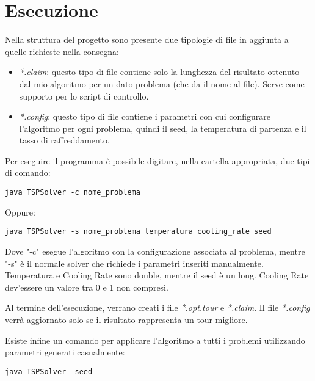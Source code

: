 \section*{Esecuzione}
\label{sec_exec}
Nella struttura del progetto sono presente due tipologie di file in aggiunta a quelle richieste nella consegna:
\begin{itemize}
	\item \emph{*.claim}: questo tipo di file contiene solo la lunghezza del risultato ottenuto dal mio algoritmo per un dato problema (che da il nome al file). Serve come supporto per lo script di controllo.
	\item \emph{*.config}: questo tipo di file contiene i parametri con cui configurare l'algoritmo per ogni problema, quindi il seed, la temperatura di partenza e il tasso di raffreddamento.
\end{itemize}
Per eseguire il programma è possibile digitare, nella cartella appropriata, due tipi di comando:
\begin{lstlisting}
java TSPSolver -c nome_problema
\end{lstlisting}
Oppure:
\begin{lstlisting}
java TSPSolver -s nome_problema temperatura cooling_rate seed
\end{lstlisting}
Dove "-c" esegue l'algoritmo con la configurazione associata al problema, mentre "-s" è il normale solver che richiede i parametri inseriti manualmente. Temperatura e Cooling Rate sono double, mentre il seed è un long. Cooling Rate dev'essere un valore tra 0 e 1 non compresi.

Al termine dell'esecuzione, verrano creati  i file \emph{*.opt.tour} e \emph{*.claim}. Il file \emph{*.config} verrà aggiornato solo se il risultato rappresenta un tour migliore.

Esiste infine un comando per applicare l'algoritmo a tutti i problemi utilizzando parametri generati casualmente:
\begin{lstlisting}
java TSPSolver -seed
\end{lstlisting}

